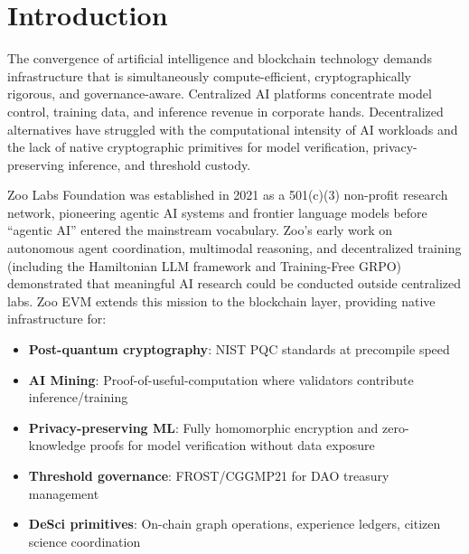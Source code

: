 \section{Introduction}


The convergence of artificial intelligence and blockchain technology demands infrastructure that is simultaneously compute-efficient, cryptographically rigorous, and governance-aware. Centralized AI platforms concentrate model control, training data, and inference revenue in corporate hands. Decentralized alternatives have struggled with the computational intensity of AI workloads and the lack of native cryptographic primitives for model verification, privacy-preserving inference, and threshold custody.

Zoo Labs Foundation was established in 2021 as a 501(c)(3) non-profit research network, pioneering agentic AI systems and frontier language models before ``agentic AI'' entered the mainstream vocabulary. Zoo's early work on autonomous agent coordination, multimodal reasoning, and decentralized training (including the Hamiltonian LLM framework and Training-Free GRPO) demonstrated that meaningful AI research could be conducted outside centralized labs. Zoo EVM extends this mission to the blockchain layer, providing native infrastructure for:

\begin{itemize}[nosep]
  \item \textbf{Post-quantum cryptography}: NIST PQC standards at precompile speed
  \item \textbf{AI Mining}: Proof-of-useful-computation where validators contribute inference/training
  \item \textbf{Privacy-preserving ML}: Fully homomorphic encryption and zero-knowledge proofs for model verification without data exposure
  \item \textbf{Threshold governance}: FROST/CGGMP21 for DAO treasury management
  \item \textbf{DeSci primitives}: On-chain graph operations, experience ledgers, citizen science coordination
\end{itemize}

